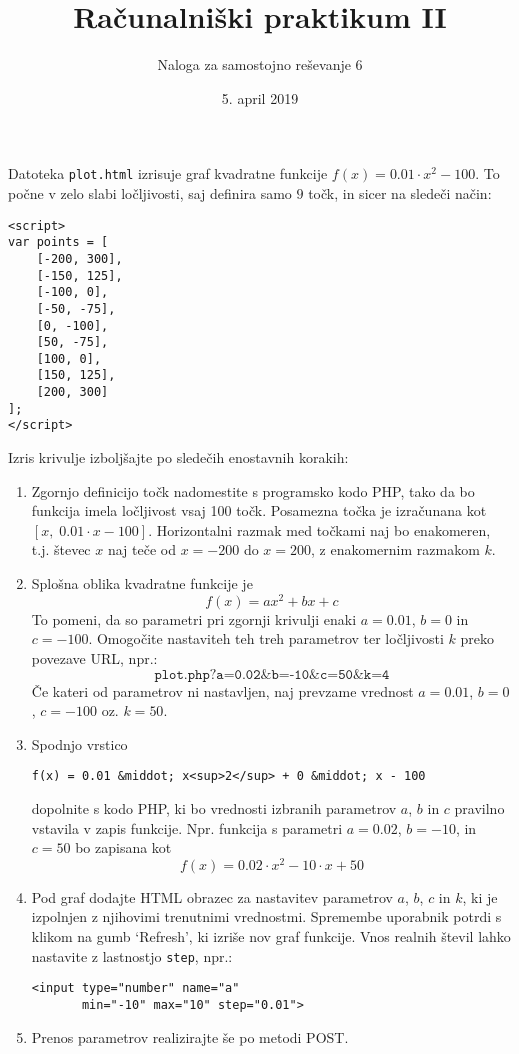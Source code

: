 \documentclass[a4paper,12pt]{article}
\title{Računalniški praktikum II}
\author{Naloga za samostojno reševanje 6}
\date{5. april 2019}
\begin{document}
\maketitle
\thispagestyle{empty}

\noindent
Datoteka \texttt{plot.html} izrisuje graf kvadratne funkcije $f(x) = 0.01 \cdot x^2 - 100$. To počne v zelo slabi ločljivosti, saj definira samo $9$ točk, in sicer na sledeči način:

\begin{verbatim}
<script>
var points = [
    [-200, 300],
    [-150, 125],
    [-100, 0],
    [-50, -75],
    [0, -100],
    [50, -75],
    [100, 0],
    [150, 125],
    [200, 300]
];
</script>
\end{verbatim}

\bigskip\noindent
Izris krivulje izboljšajte po sledečih enostavnih korakih:
\begin{enumerate}
\item Zgornjo definicijo točk nadomestite s programsko kodo PHP, tako da bo funkcija imela ločljivost vsaj 100 točk. Posamezna točka je izračunana kot $[x, \; 0.01 \cdot x - 100]$. Horizontalni razmak med točkami naj bo enakomeren, t.j. števec $x$ naj teče od $x = -200$ do $x = 200$, z enakomernim razmakom $k$.

\item Splošna oblika kvadratne funkcije je
$$
f(x) = ax^2 + bx + c
$$
To pomeni, da so parametri pri zgornji krivulji enaki $a = 0.01$, $b = 0$ in $c = -100$. Omogočite nastaviteh teh treh parametrov ter ločljivosti $k$ preko povezave URL, npr.:
$$
\texttt{plot.php?a=0.02\&b=-10\&c=50\&k=4}
$$
Če kateri od parametrov ni nastavljen, naj prevzame vrednost $a = 0.01$, $b = 0$, $c = -100$ oz. $k = 50$.

\item Spodnjo vrstico
\begin{verbatim}
f(x) = 0.01 &middot; x<sup>2</sup> + 0 &middot; x - 100
\end{verbatim}
dopolnite s kodo PHP, ki bo vrednosti izbranih parametrov $a$, $b$ in $c$ pravilno vstavila v zapis funkcije. Npr. funkcija s parametri $a = 0.02$, $b = -10$, in $c = 50$ bo zapisana kot
$$
f(x) = 0.02 \cdot x^2 - 10 \cdot x + 50
$$

\item Pod graf dodajte HTML obrazec za nastavitev parametrov $a$, $b$, $c$ in $k$, ki je izpolnjen z njihovimi trenutnimi vrednostmi. Spremembe uporabnik potrdi s klikom na gumb `Refresh', ki izriše nov graf funkcije. Vnos realnih števil lahko nastavite z lastnostjo \texttt{step}, npr.:
\begin{verbatim}
<input type="number" name="a"
       min="-10" max="10" step="0.01">
\end{verbatim}

\item Prenos parametrov realizirajte še po metodi POST.
\end{enumerate}
\end{document}
